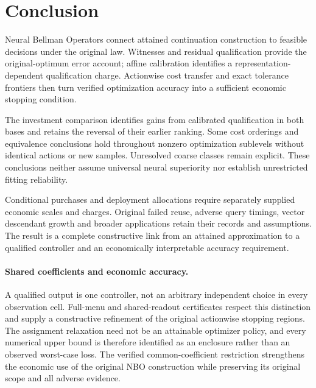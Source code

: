 \documentclass[ecta,nameyear,draft]{econsocart}
\begin{document}
\section{Conclusion}\label{sec:conclusion65}
Neural Bellman Operators connect attained continuation construction to feasible decisions under the original law. Witnesses and residual qualification provide the original-optimum error account; affine calibration identifies a representation-dependent qualification charge. Actionwise cost transfer and exact tolerance frontiers then turn verified optimization accuracy into a sufficient economic stopping condition.

The investment comparison identifies gains from calibrated qualification in both bases and retains the reversal of their earlier ranking. Some cost orderings and equivalence conclusions hold throughout nonzero optimization sublevels without identical actions or new samples. Unresolved coarse classes remain explicit. These conclusions neither assume universal neural superiority nor establish unrestricted fitting reliability.

Conditional purchases and deployment allocations require separately supplied economic scales and charges. Original failed reuse, adverse query timings, vector descendant growth and broader applications retain their records and assumptions. The result is a complete constructive link from an attained approximation to a qualified controller and an economically interpretable accuracy requirement.

\paragraph{Shared coefficients and economic accuracy.}
A qualified output is one controller, not an arbitrary independent choice in every observation cell. Full-menu and shared-readout certificates respect this distinction and supply a constructive refinement of the original actionwise stopping regions. The assignment relaxation need not be an attainable optimizer policy, and every numerical upper bound is therefore identified as an enclosure rather than an observed worst-case loss. The verified common-coefficient restriction strengthens the economic use of the original NBO construction while preserving its original scope and all adverse evidence.
\end{document}
